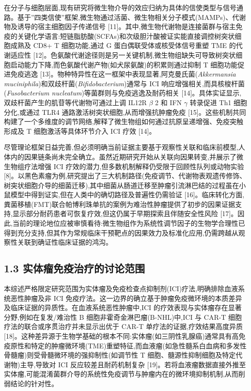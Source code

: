 在分子与细胞层面,现有研究将微生物介导的效应归纳为具体的信使类型与信号通路。基于''四类信使''框架,微生物通过活菌、微生物相关分子模式(MAMPs)、代谢物及诱导的宿主细胞因子传递信号 {[}11{]}。其中,微生物代谢物是连接菌群与宿主免疫的关键化学语言:短链脂肪酸(SCFAs)和次级胆汁酸被证实能直接调控树突状细胞成熟及 CD8+ T 细胞功能,通过 G 蛋白偶联受体或核受体信号重塑 TME 的代谢适应性 {[}12{]}。色氨酸代谢途径则是另一关键机制,微生物组缺失可导致树突状细胞启动能力下降,而色氨酸代谢产物(如犬尿氨酸)的积累则通过抑制 T 细胞功能促进免疫逃逸 {[}13{]}。物种特异性在这一框架中表现显著,阿克曼氏菌(\emph{Akkermansia muciniphila})和双歧杆菌(\emph{Bifidobacterium})通常与 ICI 响应增强相关,而具核梭杆菌(\emph{Fusobacterium nucleatum})等菌群则与免疫逃逸及耐药相关 {[}14{]}。具体实证显示,双歧杆菌产生的肌苷等代谢物可通过上调 IL12R \(\beta\) 2 和 IFN \(\gamma\) 转录促进 Th1 细胞分化,或通过 TLR4 通路激活树突状细胞,从而增强抗肿瘤免疫 {[}15{]}。这些机制共同构建了一个多维度的调节网络,解释了微生物组如何通过抗原呈递增强、免疫突触形成及 T 细胞激活等具体环节介入 ICI 疗效 {[}14{]}。

尽管理论框架日益完善,但必须明确当前证据主要基于观察性关联和临床前模型,人体内的因果链条尚未完全确立。虽然近期研究开始从关联向因果转变,并展示了微生物组疗法增强 ICI 疗效的潜力,但多数机制解释仍受限于回顾性队列或动物实验 {[}8{]}。以黑色素瘤为例,研究提出了三大机制路径(免疫调节、代谢物表观遗传修饰、树突状细胞介导的细菌迁移),其中细菌从肠道迁移至肿瘤引流淋巴结的过程虽在小鼠模型中得到证实,但在人类中的确切路径及普遍性仍需验证 {[}16{]}。临床转化方面,粪菌移植(FMT)联合帕博利珠单抗的案例为难治性肿瘤提供了初步的因果证据支持,显示部分耐药患者可恢复疗效,但这仍属于早期探索且伴随安全性风险 {[}17{]}。因此,当前的理论地位应被审慎看待:微生物组作为系统性调节因子的生物学合理性已得到充分支持,但其作为常规临床干预靶点的因果效力及标准化应用,仍需跨越从观察性关联到确证性临床证据的鸿沟。

\subsection{1.3 实体瘤免疫治疗的讨论范围}\label{ux5b9eux4f53ux7624ux514dux75abux6cbbux7597ux7684ux8ba8ux8bbaux8303ux56f4}

本综述严格限定研究范围为实体瘤及免疫检查点抑制剂(ICI)疗法,明确排除血液系统恶性肿瘤及非 ICI 免疫疗法。这一边界的确立基于肿瘤免疫微环境的本质差异及临床证据的异质性。在血液系统恶性肿瘤中,ICI 的疗效表现与实体瘤存在显著分野,例如在复发/难治性 B 细胞非霍奇金淋巴瘤(B-NHL)中,ICI 与 CAR-T 细胞疗法的联合或序贯治疗并未显示出优于 CAR-T 单疗法的证据,疗效结果高度异质 {[}18{]}。这种差异源于生物学基础的根本不同:实体瘤(如三阴性乳腺癌)通常具有高免疫原性和特定的肿瘤微环境(TME)重塑特征,而血液瘤(如急性髓系白血病和多发性骨髓瘤)则受骨髓微环境的强抑制性(如调节性 T 细胞、髓源性抑制细胞及特定代谢物)主导,导致对 ICI 反应较差且耐药机制复杂 {[}19{]}。若将血液瘤数据直接外推至实体瘤,可能混淆菌群介导的系统性免疫调节与肿瘤内在的微环境抑制机制,从而削弱结论的针对性。

